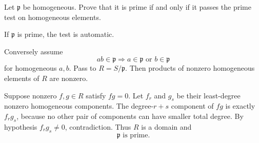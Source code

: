 \begin{problem}\label{prob:vi34-03}
Let \(\mathfrak p\) be homogeneous. Prove that it is prime if and only if it passes the prime test on homogeneous elements.
\end{problem}

\ifdefined\FullProblemDossiers
\begin{solution}
If \(\mathfrak p\) is prime, the test is automatic.

Conversely assume
\[
ab\in\mathfrak p\Longrightarrow a\in\mathfrak p\text{ or }b\in\mathfrak p
\]
for homogeneous \(a,b\). Pass to \(R=S/\mathfrak p\). Then products of nonzero homogeneous elements of \(R\)
are nonzero.

Suppose nonzero \(f,g\in R\) satisfy \(fg=0\). Let \(f_r\) and \(g_s\) be their least-degree nonzero homogeneous
components. The degree-\(r+s\) component of \(fg\) is exactly \(f_rg_s\), because no other pair of components can
have smaller total degree. By hypothesis \(f_rg_s\neq0\), contradiction. Thus \(R\) is a domain and
\[
\boxed{\mathfrak p\text{ is prime}}.
\]
\end{solution}
\fi
